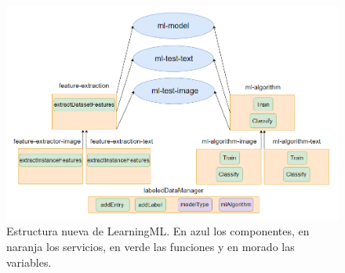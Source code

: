 \documentclass[a4paper, 12pt]{book}
\begin{document}
\begin{figure}
	\centering
	\includegraphics[width=12cm, keepaspectratio]{img/modelonuevo}
	\caption{Estructura nueva de LearningML. En azul los componentes, en naranja los servicios, en verde las funciones y en morado las variables.}					\label{fig:modelonuevo}
\end{figure}
\end{document}

